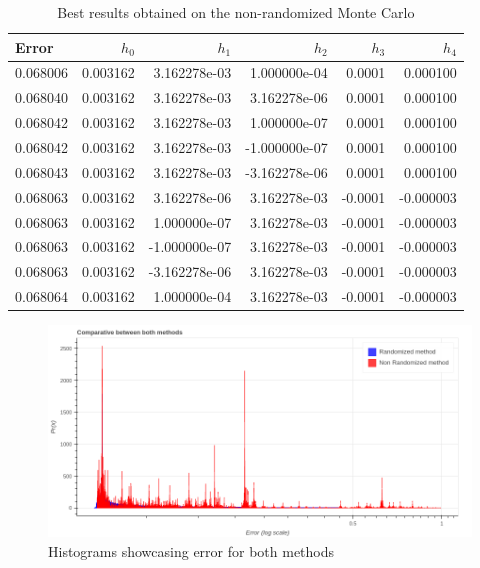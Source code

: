\documentclass[openany]{article}
\begin{document}
\begin{table}[!h]
    \centering
\begin{tabular}{lrrrrr}
\toprule
\textbf{Error} &       \textbf{\(h_0\)} &           \textbf{\(h_1\)} &       \textbf{\(h_2\)} &           \textbf{\(h_3\)} &    \textbf{\(h_4\)} \\
\midrule
\hline
\hline 
0.068006                &  0.003162 &  3.162278e-03 &  1.000000e-04 &  0.0001 &  0.000100 \\
0.068040                &  0.003162 &  3.162278e-03 &  3.162278e-06 &  0.0001 &  0.000100 \\
0.068042                &  0.003162 &  3.162278e-03 &  1.000000e-07 &  0.0001 &  0.000100 \\
0.068042                &  0.003162 &  3.162278e-03 & -1.000000e-07 &  0.0001 &  0.000100 \\
0.068043                &  0.003162 &  3.162278e-03 & -3.162278e-06 &  0.0001 &  0.000100 \\
0.068063                &  0.003162 &  3.162278e-06 &  3.162278e-03 & -0.0001 & -0.000003 \\
0.068063                &  0.003162 &  1.000000e-07 &  3.162278e-03 & -0.0001 & -0.000003 \\
0.068063                &  0.003162 & -1.000000e-07 &  3.162278e-03 & -0.0001 & -0.000003 \\
0.068063                &  0.003162 & -3.162278e-06 &  3.162278e-03 & -0.0001 & -0.000003 \\
0.068064                &  0.003162 &  1.000000e-04 &  3.162278e-03 & -0.0001 & -0.000003 \\
\bottomrule
\hline
\hline 

\end{tabular}
    \caption{Best results obtained on the non-randomized Monte Carlo}
    \label{tab:my_label}
\end{table}
\newpage 

\begin{figure}[!h]
    \centering
    \includegraphics[width=\textwidth]{Comparative_Random_NONRandom.png}
    \caption{Histograms showcasing error for both methods}
    \label{fig:my_label}
\end{figure}
\end{document}
